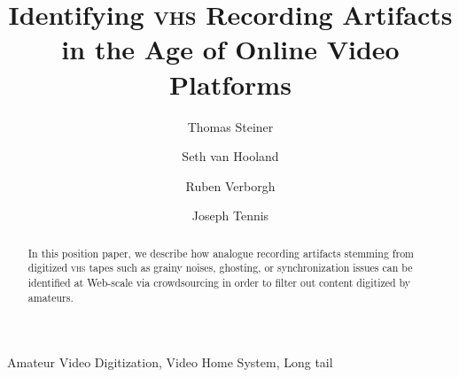 \documentclass[runningheads,a4paper]{llncs}
\newcommand{\keywords}[1]{\par\addvspace\baselineskip
\noindent\keywordname\enspace\ignorespaces#1}
\begin{document}
\mainmatter

\title{Identifying {\scshape vhs} Recording Artifacts\\
in the Age of Online Video Platforms}


\author{Thomas Steiner \and
        Seth van Hooland \and
        Ruben Verborgh\and
        Joseph Tennis}


\maketitle

\setcounter{footnote}{0}

\vspace{-1em}
\begin{abstract}
In this position paper, we describe how analogue recording artifacts
stemming from digitized {\scshape vhs} tapes such as
grainy noises, ghosting, or synchronization issues
can be identified at Web-scale via crowdsourcing
in order to filter out content digitized by amateurs.
\end{abstract}

\vspace{-2em}
\keywords{Amateur Video Digitization, Video Home System, Long tail}
\end{document}
